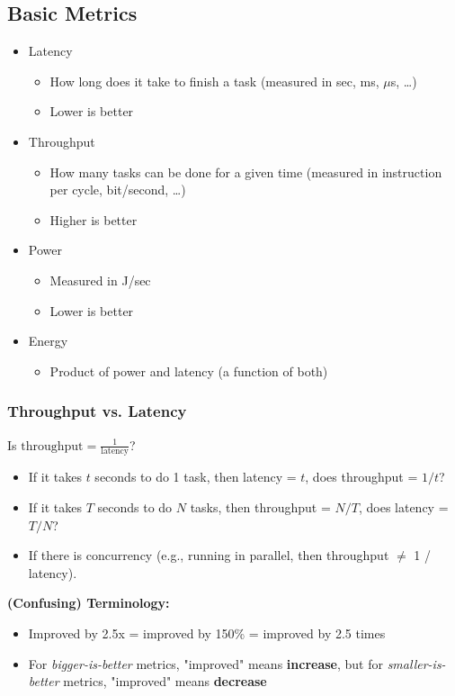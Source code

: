 \documentclass[10pt]{article}
\begin{document}
\subsection*{Basic Metrics}
\begin{itemize}
    \item Latency
    \begin{itemize}
        \item How long does it take to finish a task (measured in sec, ms, $\mu$s, \dots)
        \item Lower is better
    \end{itemize}
    \item Throughput
    \begin{itemize}
        \item How many tasks can be done for a given time (measured in instruction per cycle, bit/second, \dots)
        \item Higher is better
    \end{itemize}
    \item Power
    \begin{itemize}
        \item Measured in J/sec
        \item Lower is better
    \end{itemize}
    \item Energy
    \begin{itemize}
        \item Product of power and latency (a function of both)
    \end{itemize}
\end{itemize}
\subsubsection*{Throughput vs. Latency}
Is $\text{throughput} = \frac{1}{\text{latency}}$?
\begin{itemize}
    \item If it takes $t$ seconds to do 1 task, then latency = $t$, does throughput = $1 / t$?
    \item If it takes $T$ seconds to do $N$ tasks, then throughput = $N / T$, does latency = $T / N$?
    \item If there is concurrency (e.g., running in parallel, then throughput $\neq$ 1 / latency).
\end{itemize}
\textbf{(Confusing) Terminology:}
\begin{itemize}
    \item Improved by 2.5x = improved by 150\% = improved by 2.5 times
    \item For \textit{bigger-is-better} metrics, "improved" means \textbf{increase}, but for \textit{smaller-is-better} metrics, "improved" means \textbf{decrease}
\end{itemize}
\end{document}
